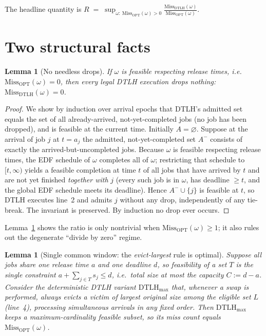 \documentclass{amsart}
\newtheorem{lemma}[theorem]{Lemma}
\theoremstyle{definition}
\begin{document}
The headline quantity is
\(
R \;=\; \sup_{\omega:\ \mathrm{Miss}_{\mathrm{OPT}}(\omega)>0}
\frac{\mathrm{Miss}_{\mathrm{DTLH}}(\omega)}{\mathrm{Miss}_{\mathrm{OPT}}(\omega)} .
\)

\section{Two structural facts}

\begin{lemma}[No needless drops]\label{lem:nowaste}
If $\omega$ is feasible respecting release times, i.e.\
$\mathrm{Miss}_{\mathrm{OPT}}(\omega)=0$, then \emph{every} legal DTLH execution
drops nothing: $\mathrm{Miss}_{\mathrm{DTLH}}(\omega)=0$.
\end{lemma}

\begin{proof}
We show by induction over arrival epochs that DTLH's admitted set equals the set
of all already-arrived, not-yet-completed jobs (no job has been dropped), and is
feasible at the current time. Initially $A=\varnothing$. Suppose at the arrival
of job $j$ at $t=a_j$ the admitted, not-yet-completed set $A^-$ consists of
exactly the arrived-but-uncompleted jobs. Because $\omega$ is feasible
respecting release times, the EDF schedule of $\omega$ completes all of $\omega$;
restricting that schedule to $[t,\infty)$ yields a feasible completion at time
$t$ of all jobs that have arrived by $t$ and are not yet finished \emph{together
with} $j$ (every such job is in $\omega$, has deadline $\ge t$, and the global
EDF schedule meets its deadline). Hence $A^-\cup\{j\}$ is feasible at $t$, so
DTLH executes line~2 and admits $j$ without any drop, independently of any
tie-break. The invariant is preserved. By induction no drop ever occurs.
\end{proof}

Lemma~\ref{lem:nowaste} shows the ratio is only nontrivial when
$\mathrm{Miss}_{\mathrm{OPT}}(\omega)\ge 1$; it also rules out the degenerate
``divide by zero'' regime.

\begin{lemma}[Single common window: the \emph{evict-largest} rule is optimal]
\label{lem:onewindow}
Suppose all jobs share one release time $a$ and one deadline $d$, so feasibility
of a set $T$ is the single constraint $a+\sum_{j\in T}s_j\le d$, i.e.\ total size
at most the capacity $C:=d-a$. Consider the deterministic DTLH variant
$\mathrm{DTLH}_{\max}$ that, whenever a swap is performed, always evicts a victim
of \emph{largest} original size among the eligible set $L$ (line~4), processing
simultaneous arrivals in any fixed order. Then
$\mathrm{DTLH}_{\max}$ keeps a maximum-cardinality feasible subset, so its miss
count equals $\mathrm{Miss}_{\mathrm{OPT}}(\omega)$.
\end{lemma}
\end{document}
